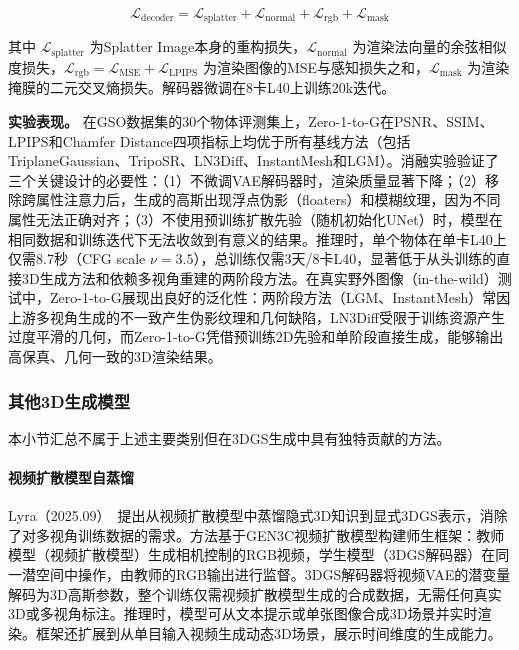 \begin{equation}
\mathcal{L}_{\text{decoder}} = \mathcal{L}_{\text{splatter}} + \mathcal{L}_{\text{normal}} + \mathcal{L}_{\text{rgb}} + \mathcal{L}_{\text{mask}}
\end{equation}

其中 $\mathcal{L}_{\text{splatter}}$ 为Splatter Image本身的重构损失，$\mathcal{L}_{\text{normal}}$ 为渲染法向量的余弦相似度损失，$\mathcal{L}_{\text{rgb}} = \mathcal{L}_{\text{MSE}} + \mathcal{L}_{\text{LPIPS}}$ 为渲染图像的MSE与感知损失之和，$\mathcal{L}_{\text{mask}}$ 为渲染掩膜的二元交叉熵损失。解码器微调在8卡L40上训练20k迭代。

\textbf{实验表现。}
在GSO数据集的30个物体评测集上，Zero-1-to-G在PSNR、SSIM、LPIPS和Chamfer Distance四项指标上均优于所有基线方法（包括TriplaneGaussian、TripoSR、LN3Diff、InstantMesh和LGM）。消融实验验证了三个关键设计的必要性：（1）不微调VAE解码器时，渲染质量显著下降；（2）移除跨属性注意力后，生成的高斯出现浮点伪影（floaters）和模糊纹理，因为不同属性无法正确对齐；（3）不使用预训练扩散先验（随机初始化UNet）时，模型在相同数据和训练迭代下无法收敛到有意义的结果。推理时，单个物体在单卡L40上仅需8.7秒（CFG scale $\nu=3.5$），总训练仅需3天/8卡L40，显著低于从头训练的直接3D生成方法和依赖多视角重建的两阶段方法。在真实野外图像（in-the-wild）测试中，Zero-1-to-G展现出良好的泛化性：两阶段方法（LGM、InstantMesh）常因上游多视角生成的不一致产生伪影纹理和几何缺陷，LN3Diff受限于训练资源产生过度平滑的几何，而Zero-1-to-G凭借预训练2D先验和单阶段直接生成，能够输出高保真、几何一致的3D渲染结果。

\subsubsection{其他3D生成模型}

本小节汇总不属于上述主要类别但在3DGS生成中具有独特贡献的方法。

\paragraph{视频扩散模型自蒸馏}

Lyra（2025.09）~\cite{2509_19296}提出从视频扩散模型中蒸馏隐式3D知识到显式3DGS表示，消除了对多视角训练数据的需求。方法基于GEN3C视频扩散模型构建师生框架：教师模型（视频扩散模型）生成相机控制的RGB视频，学生模型（3DGS解码器）在同一潜空间中操作，由教师的RGB输出进行监督。3DGS解码器将视频VAE的潜变量解码为3D高斯参数，整个训练仅需视频扩散模型生成的合成数据，无需任何真实3D或多视角标注。推理时，模型可从文本提示或单张图像合成3D场景并实时渲染。框架还扩展到从单目输入视频生成动态3D场景，展示时间维度的生成能力。

